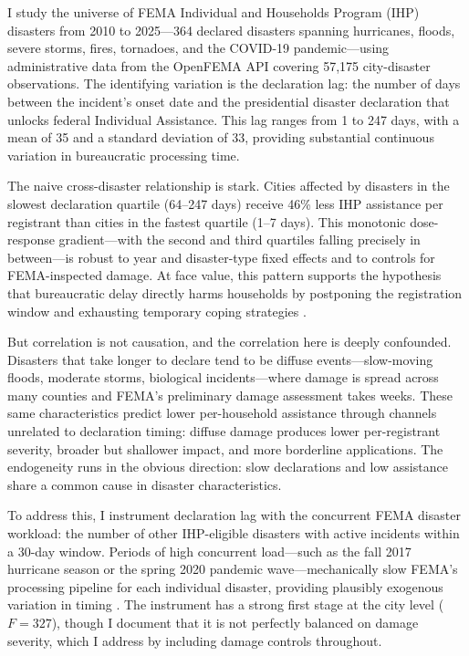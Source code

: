 \documentclass[12pt]{article}
\begin{document}
I study the universe of FEMA Individual and Households Program (IHP) disasters from 2010 to 2025---364 declared disasters spanning hurricanes, floods, severe storms, fires, tornadoes, and the COVID-19 pandemic---using administrative data from the OpenFEMA API covering 57,175 city-disaster observations. The identifying variation is the declaration lag: the number of days between the incident's onset date and the presidential disaster declaration that unlocks federal Individual Assistance. This lag ranges from 1 to 247 days, with a mean of 35 and a standard deviation of 33, providing substantial continuous variation in bureaucratic processing time.

The naive cross-disaster relationship is stark. Cities affected by disasters in the slowest declaration quartile (64--247 days) receive 46\% less IHP assistance per registrant than cities in the fastest quartile (1--7 days). This monotonic dose-response gradient---with the second and third quartiles falling precisely in between---is robust to year and disaster-type fixed effects and to controls for FEMA-inspected damage. At face value, this pattern supports the hypothesis that bureaucratic delay directly harms households by postponing the registration window and exhausting temporary coping strategies \citep{deryugina2017}.

But correlation is not causation, and the correlation here is deeply confounded. Disasters that take longer to declare tend to be diffuse events---slow-moving floods, moderate storms, biological incidents---where damage is spread across many counties and FEMA's preliminary damage assessment takes weeks. These same characteristics predict lower per-household assistance through channels unrelated to declaration timing: diffuse damage produces lower per-registrant severity, broader but shallower impact, and more borderline applications. The endogeneity runs in the obvious direction: slow declarations and low assistance share a common cause in disaster characteristics.

To address this, I instrument declaration lag with the concurrent FEMA disaster workload: the number of other IHP-eligible disasters with active incidents within a 30-day window. Periods of high concurrent load---such as the fall 2017 hurricane season or the spring 2020 pandemic wave---mechanically slow FEMA's processing pipeline for each individual disaster, providing plausibly exogenous variation in timing \citep{gallagher2017, strömberg2007}. The instrument has a strong first stage at the city level ($F = 327$), though I document that it is not perfectly balanced on damage severity, which I address by including damage controls throughout.
\end{document}
